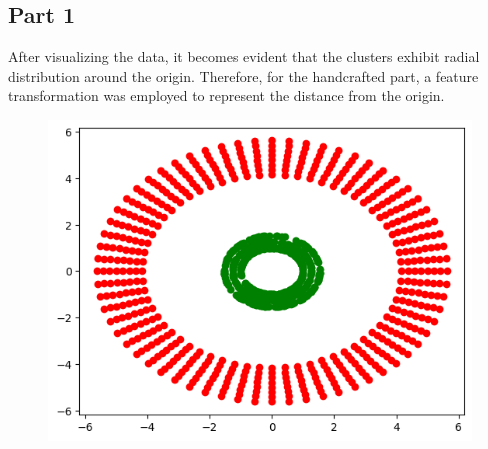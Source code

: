 \documentclass[a4paper,11pt]{article}
\begin{document}
\begin{mlsolution}
\subsection{Part 1}
After visualizing the data, it becomes evident that the clusters exhibit radial distribution around the origin. Therefore, for the handcrafted part, a feature transformation was employed to represent the distance from the origin.
\begin{figure}[H]
	\centering
	\includegraphics[width=0.5\linewidth]{5.2.1.png}
	\label{fig:5.2.1}
\end{figure}


\end{mlsolution}
\end{document}
